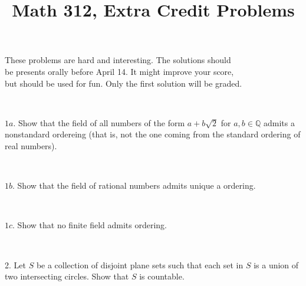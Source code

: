 \documentclass{article}
\def\noi{\noindent}%
\def\QQ{\mathbb{Q}}%
\begin{document}
\title{Math 312, Extra Credit Problems}
\author{}
\date{}
\maketitle

\begin{center}
{\small These problems are hard and interesting. The solutions should \\
be presents orally before April 14. It might improve your score,\\
but should be used for fun. Only the first solution will be graded.}
\end{center}
\thispagestyle{empty}

\ 

\noi $1a$. Show that the field of all numbers of the form $a+b\sqrt{2}$ for $a,b\in \QQ$ admits a nonstandard ordereing (that is, not the one coming from the standard ordering of real numbers).

\ 

\noi $1b$. Show that the field of rational numbers admits unique a ordering.

\ 

\noi $1c$. Show that no finite field admits ordering.

\ 

2. Let $S$ be a collection of disjoint plane sets such that each set in $S$ is a union of two intersecting circles. Show that $S$ is countable.
\end{document}
